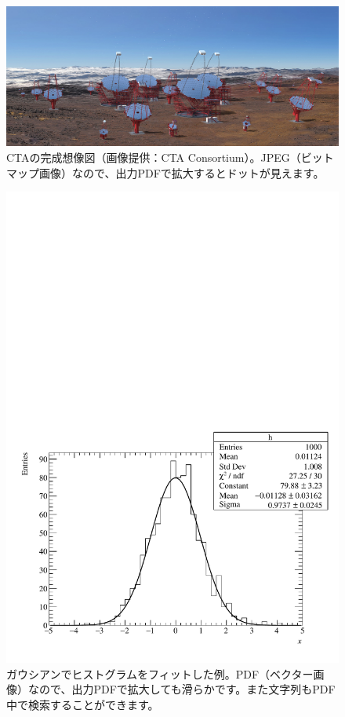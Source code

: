 \begin{figure} %
  \centering
  \includegraphics[width=14cm]{fig/CTA.jpg}
  \caption[CTAの完成想像図]{CTAの完成想像図（画像提供：CTA Consortium）。JPEG（ビットマップ画像）なので、出力PDFで拡大するとドットが見えます。}
  \label{fig_CTA}
\end{figure}

\begin{figure}
  \centering
  \includegraphics[width=14cm]{fig/histogram.pdf}
  \caption[ガウシアンでヒストグラムをフィットした例]{ガウシアンでヒストグラムをフィットした例。PDF（ベクター画像）なので、出力PDFで拡大しても滑らかです。また文字列もPDF中で検索することができます。}
  \label{fig_histogram}
\end{figure}

